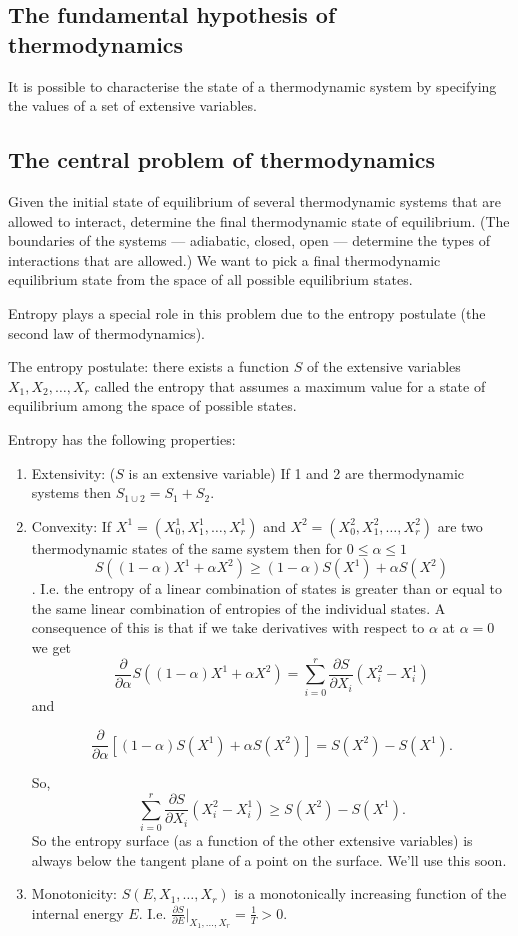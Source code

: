 \subsection*{The fundamental hypothesis of thermodynamics}
It is possible to characterise the state of a thermodynamic system by specifying the values of a set of extensive variables.

\subsection*{The central problem of thermodynamics}
Given the initial state of equilibrium of several thermodynamic systems that are allowed to interact, determine the final thermodynamic state of equilibrium. (The boundaries of the systems --- adiabatic, closed, open --- determine the types of interactions that are allowed.) We want to pick a final thermodynamic equilibrium state from the space of all possible equilibrium states.

Entropy plays a special role in this problem due to the entropy postulate (the second law of thermodynamics).

The entropy postulate: there exists a function $S$ of the extensive variables $X_1,X_2,\ldots,X_r$ called the entropy that assumes a maximum value for a state of equilibrium among the space of possible states.

Entropy has the following properties:
\begin{enumerate}
\item Extensivity: ($S$ is an extensive variable) If 1 and 2 are thermodynamic systems then $S_{1\cup2}=S_1+S_2$.
\item Convexity: If $X^1=(X_0^1,X_1^1,\ldots,X_r^1)$ and  $X^2=(X_0^2,X_1^2,\ldots,X_r^2)$ are two thermodynamic states of the same system then for $0\leq\alpha\leq1$
$$ S((1-\alpha)X^1+\alpha X^2)\geq (1-\alpha)S(X^1)+\alpha S(X^2) $$.
I.e. the entropy of a linear combination of states is greater than or equal to the same linear combination of entropies of the individual states.
A consequence of this is that if we take derivatives with respect to $\alpha$ at $\alpha=0$ we get
$$\frac{\partial}{\partial \alpha} S((1-\alpha)X^1+\alpha X^2) = \sum_{i=0}^r\frac{\partial S}{\partial X_i}(X_i^2-X_i^1)$$
and

$$\frac{\partial}{\partial \alpha} \left[ (1-\alpha)S(X^1)+\alpha S(X^2) \right] = S(X^2)-S(X^1).$$

So,
$$ \sum_{i=0}^r\frac{\partial S}{\partial X_i}(X_i^2-X_i^1)\geq  S(X^2)-S(X^1).$$
So the entropy surface (as a function of the other extensive variables) is always below the tangent plane of a point on the surface. We'll use this soon.
\item Monotonicity: $S(E,X_1,\ldots,X_r)$ is a monotonically increasing function of the internal energy $E$. I.e. $\frac{\partial S}{\partial E}\vert_{X_1,\ldots,X_r} = \frac{1}{T}>0$.
\end{enumerate}

